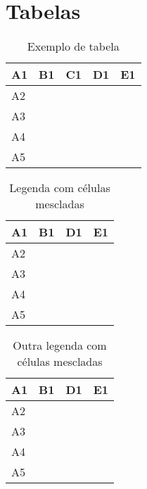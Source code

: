 \documentclass{article}
\begin{document}
\section{Tabelas}

\begin{table}[H]
  \centering
  \label{tab:tab1}
  \begin{tabular}{|l|l|l|l|l|}
    \hline
    A1 & B1 & C1 & D1 & E1 \\ \hline
    A2 &    &    &    &    \\ \hline
    A3 &    &    &    &    \\ \hline
    A4 &    &    &    &    \\ \hline
    A5 &    &    &    &    \\ \hline
  \end{tabular}
  \caption[Legenda Curta]{Exemplo de tabela}
\end{table}

\begin{table}[H]
  \centering
  \label{tab:tab2}
  \begin{tabular}{|l|ll|l|l|}
    \hline
    A1 & \multicolumn{2}{l|}{B1}  & D1 & E1 \\ \hline
    A2 & \multicolumn{1}{l|}{} &  &    &    \\ \hline
    A3 & \multicolumn{1}{l|}{} &  &    &    \\ \hline
    A4 & \multicolumn{1}{l|}{} &  &    &    \\ \hline
    A5 & \multicolumn{1}{l|}{} &  &    &    \\ \hline
  \end{tabular}
  \caption[Legenda Maior]{Legenda com células mescladas}
\end{table}

\begin{table}[H]
  \centering
  \label{tab:tab3}
  \begin{tabular}{|l|ll|ll|}
    \hline
    A1 & \multicolumn{2}{l|}{B1}  & \multicolumn{1}{l|}{D1}      & E1
    \\ \hline
    A2 & \multicolumn{1}{l|}{} &  &
    \multicolumn{2}{l|}{\multirow{2}{*}{}} \\ \cline{1-3}
    A3 & \multicolumn{1}{l|}{} &  & \multicolumn{2}{l|}{}
    \\ \hline
    A4 & \multicolumn{1}{l|}{} &  & \multicolumn{1}{l|}{}        &
    \\ \hline
    A5 & \multicolumn{1}{l|}{} &  & \multicolumn{1}{l|}{}        &
    \\ \hline
  \end{tabular}
  \caption[Legenda Maior]{Outra legenda com células mescladas}
\end{table}
\end{document}
